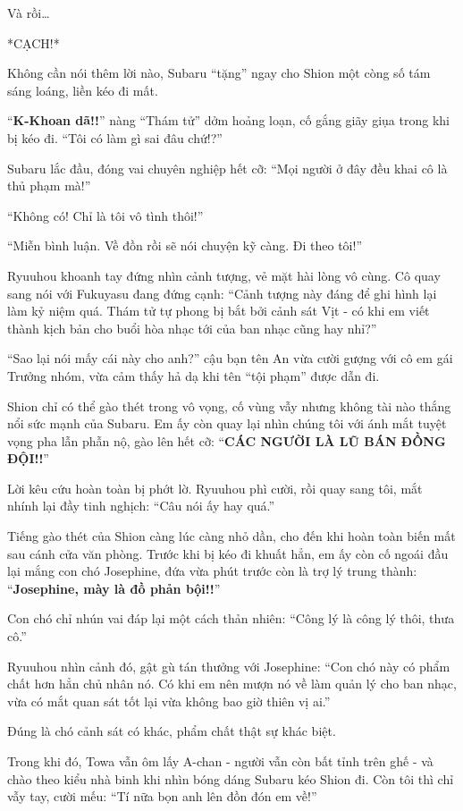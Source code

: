 \documentclass[../main.tex]{subfiles}
\begin{document}
Và rồi\dots

*CẠCH!*

Không cần nói thêm lời nào, Subaru ``tặng'' ngay cho Shion một còng số tám sáng loáng, liền kéo đi mất.


``\textbf{K-Khoan dã!!}'' nàng ``Thám tử'' dởm hoảng loạn, cố gắng giãy giụa trong khi bị kéo đi. ``Tôi có làm gì sai đâu chứ!?''

Subaru lắc đầu, đóng vai chuyên nghiệp hết cỡ: ``Mọi người ở đây đều khai cô là thủ phạm mà!''

``Không có! Chỉ là tôi vô tình thôi!''

``Miễn bình luận. Về đồn rồi sẽ nói chuyện kỹ càng. Đi theo tôi!''

Ryuuhou khoanh tay đứng nhìn cảnh tượng, vẻ mặt hài lòng vô cùng. Cô quay sang nói với Fukuyasu đang đứng cạnh: ``Cảnh tượng này đáng để ghi hình lại làm kỷ niệm quá. Thám tử tự phong bị bắt bởi cảnh sát Vịt - có khi em viết thành kịch bản cho buổi hòa nhạc tới của ban nhạc cũng hay nhỉ?''

``Sao lại nói mấy cái này cho anh?'' cậu bạn tên An vừa cười gượng với cô em gái Trưởng nhóm, vừa cảm thấy hả dạ khi tên ``tội phạm'' được dẫn đi.

Shion chỉ có thể gào thét trong vô vọng, cố vùng vẫy nhưng không tài nào thắng nổi sức mạnh của Subaru. Em ấy còn quay lại nhìn chúng tôi với ánh mắt tuyệt vọng pha lẫn phẫn nộ, gào lên hết cỡ: ``\textbf{CÁC NGƯỜI LÀ LŨ BÁN ĐỒNG ĐỘI!!}''

Lời kêu cứu hoàn toàn bị phớt lờ. Ryuuhou phì cười, rồi quay sang tôi, mắt nhính lại đầy tinh nghịch: ``Câu nói ấy hay quá.''

Tiếng gào thét của Shion càng lúc càng nhỏ dần, cho đến khi hoàn toàn biến mất sau cánh cửa văn phòng. Trước khi bị kéo đi khuất hẳn, em ấy còn cố ngoái đầu lại mắng con chó Josephine, đứa vừa phút trước còn là trợ lý trung thành: ``\textbf{Josephine, mày là đồ phản bội!!}''

Con chó chỉ nhún vai đáp lại một cách thản nhiên: ``Công lý là công lý thôi, thưa cô.''

Ryuuhou nhìn cảnh đó, gật gù tán thưởng với Josephine: ``Con chó này có phẩm chất hơn hẳn chủ nhân nó. Có khi em nên mượn nó về làm quản lý cho ban nhạc, vừa có mắt quan sát tốt lại vừa không bao giờ thiên vị ai.''

Đúng là chó cảnh sát có khác, phẩm chất thật sự khác biệt.

Trong khi đó, Towa vẫn ôm lấy A-chan - người vẫn còn bất tỉnh trên ghế - và chào theo kiểu nhà binh khi nhìn bóng dáng Subaru kéo Shion đi. Còn tôi thì chỉ vẫy tay, cười mếu: ``Tí nữa bọn anh lên đồn đón em về!''
\end{document}
